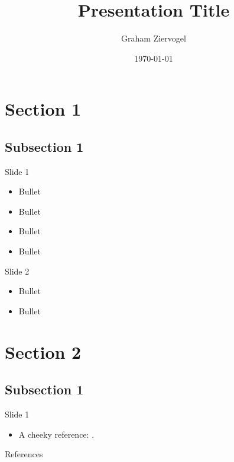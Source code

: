 \documentclass[10pt]{beamer}
\title{Presentation Title}
\author{Graham Ziervogel}
\institute{Organisation}
\date{\today}
\begin{document}
\begin{frame}
	\titlepage
\end{frame}

\section{Section 1}
\subsection{Subsection 1}

\begin{frame}{Slide 1}
\begin{itemize}
\pause
\item Bullet
\pause
\item Bullet
\pause
\item Bullet
\pause
\item Bullet
\end{itemize}
\end{frame}

\begin{frame}{Slide 2}
\begin{itemize}
\pause
\item Bullet
\pause
\item Bullet
\end{itemize}
\end{frame}

\section{Section 2}
\subsection{Subsection 1}

\begin{frame}{Slide 1}
\begin{itemize}
\pause
\item A cheeky reference: \cite{AA14}.
\end{itemize}
\end{frame}

\nocite{MSA16}

\begin{frame}{References}
	\footnotesize
	
	
\end{frame}
\end{document}
